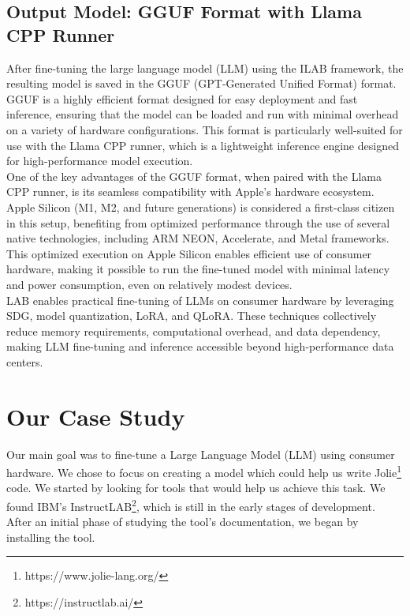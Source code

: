 \documentclass[12pt]{article}
\begin{document}
\subsection{Output Model: GGUF Format with Llama CPP Runner}\label{gguf}
After fine-tuning the large language model (LLM) using the ILAB framework, the resulting model is saved in the GGUF (GPT-Generated Unified Format) format.\\
GGUF is a highly efficient format designed for easy deployment and fast inference, ensuring that the model can be loaded and run with minimal overhead on a variety of hardware configurations. This format is particularly well-suited for use with the Llama CPP runner, which is a lightweight inference engine designed for high-performance model execution.\\
One of the key advantages of the GGUF format, when paired with the Llama CPP runner, is its seamless compatibility with Apple's hardware ecosystem. Apple Silicon (M1, M2, and future generations) is considered a first-class citizen in this setup, benefiting from optimized performance through the use of several native technologies, including ARM NEON, Accelerate, and Metal frameworks.\\
This optimized execution on Apple Silicon enables efficient use of consumer hardware, making it possible to run the fine-tuned model with minimal latency and power consumption, even on relatively modest devices.\vspace{14pt}\\
LAB enables practical fine-tuning of LLMs on consumer hardware by leveraging SDG, model quantization, LoRA, and QLoRA. These techniques collectively reduce memory requirements, computational overhead, and data dependency, making LLM fine-tuning and inference accessible beyond high-performance data centers.

\section{Our Case Study}
Our main goal was to fine-tune a Large Language Model (LLM) using consumer hardware. We chose to focus on creating a model which could help us write Jolie\footnote{https://www.jolie-lang.org/} code. We started by looking for tools that would help us achieve this task. We found IBM's InstructLAB\footnote{https://instructlab.ai/}, which is still in the early stages of development.\vspace{14pt}\\
After an initial phase of studying the tool's documentation, we began by installing the tool.
\end{document}
